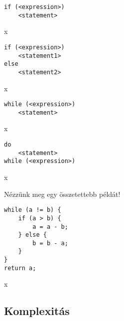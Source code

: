 \begin{minipage}{0.5\linewidth}
\begin{lstlisting}
if (<expression>)
	<statement>
\end{lstlisting}
\end{minipage}
\begin{minipage}{0.5\linewidth}
	x
\end{minipage}



\begin{minipage}{0.5\linewidth}
\begin{lstlisting}
if (<expression>)
	<statement1>
else
	<statement2>
\end{lstlisting}
\end{minipage}
\begin{minipage}{0.5\linewidth}
	x
\end{minipage}



\begin{minipage}{0.5\linewidth}
\begin{lstlisting}
while (<expression>)
	<statement>
\end{lstlisting}
\end{minipage}
\begin{minipage}{0.5\linewidth}
	x
\end{minipage}



\begin{minipage}{0.5\linewidth}
\begin{lstlisting}
do
	<statement>
while (<expression>)
\end{lstlisting}
\end{minipage}
\begin{minipage}{0.5\linewidth}
	x
\end{minipage}

Nézzünk meg egy összetettebb példát!

\begin{minipage}{0.5\linewidth}
\begin{lstlisting}
while (a != b) {
	if (a > b) {
		a = a - b;
	} else {
		b = b - a;
	}
}
return a;
\end{lstlisting}
\end{minipage}
\begin{minipage}{0.5\linewidth}
	x
\end{minipage}

\subsection{Komplexitás}

